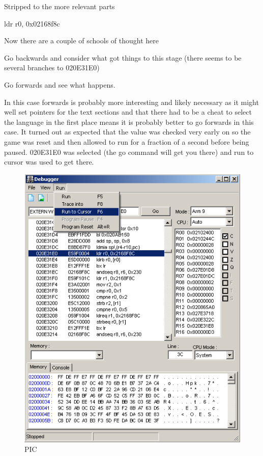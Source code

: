 \documentclass[
]{book}
\begin{document}
Stripped to the more relevant parts

ldr r0, 0x02168f8c

Now there are a couple of schools of thought here

Go backwards and consider what got things to this stage (there seems to be several branches to 020E31E0)

Go forwards and see what happens.

In this case forwards is probably more interesting and likely necessary as it might well set pointers for the text sections and that there had to be a cheat to select the language in the first place means it is probably better to go forwards in this case. It turned out as expected that the value was checked very early on so the game was reset and then allowed to run for a fraction of a second before being paused. 020E31E0 was selected (the go command will get you there) and run to cursor was used to get there.

\begin{figure}
\centering
\includegraphics{images/218_home_fast6191_romhackingguide_unrenamed_fil___iginal_borders_romhackguideasmlanguagemod_3.png}
\caption{PIC}
\end{figure}
\end{document}
